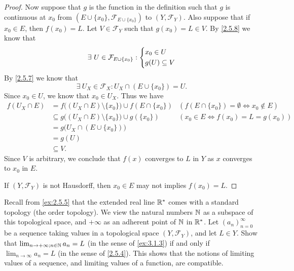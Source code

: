 \begin{proof}
  Now suppose that \(g\) is the function in the definition such that \(g\) is continuous at \(x_0\) from \((E \cup \{x_0\}, \mathcal{F}_{E \cup \{x_0\}})\) to \((Y, \mathcal{F}_Y)\).
  Also suppose that if \(x_0 \in E\), then \(f(x_0) = L\).
  Let \(V \in \mathcal{F}_Y\) such that \(g(x_0) = L \in V\).
  By \cref{2.5.8} we know that
  \[
    \exists\ U \in \mathcal{F}_{E \cup \{x_0\}} : \begin{dcases}
      x_0 \in U \\
      g(U) \subseteq V
    \end{dcases}
  \]
  By \cref{2.5.7} we know that
  \[
    \exists\ U_X \in \mathcal{F}_X : U_X \cap (E \cup \{x_0\}) = U.
  \]
  Since \(x_0 \in U\), we know that \(x_0 \in U_X\).
  Thus we have
  \begin{align*}
    f(U_X \cap E) & = f\big((U_X \cap E) \setminus \{x_0\}\big) \cup f(E \cap \{x_0\})  & (f(E \cap \{x_0\}) = \emptyset \iff x_0 \notin E) \\
                  & \subseteq g\big((U_X \cap E) \setminus \{x_0\}\big) \cup g(\{x_0\}) & (x_0 \in E \iff f(x_0) = L = g(x_0))              \\
                  & = g\big(U_X \cap (E \cup \{x_0\})\big)                                                                                  \\
                  & = g(U)                                                                                                                  \\
                  & \subseteq V.
  \end{align*}
  Since \(V\) is arbitrary, we conclude that \(f(x)\) converges to \(L\) in \(Y\) as \(x\) converges to \(x_0\) in \(E\).

  If \((Y, \mathcal{F}_Y)\) is not Hausdorff, then \(x_0 \in E\) may not implies \(f(x_0) = L\).
\end{proof}

\begin{ex}\label{ex:3.1.4}
  Recall from \cref{ex:2.5.5} that the extended real line \(\mathbb{R}^*\) comes with a standard topology (the order topology).
  We view the natural numbers \(\mathbb{N}\) as a subspace of this topological space, and \(+\infty\) as an adherent point of \(\mathbb{N}\) in \(\mathbb{R}^*\).
  Let \((a_n)_{n = 0}^\infty\) be a sequence taking values in a topological space \((Y, \mathcal{F}_Y)\), and let \(L \in Y\).
  Show that \(\lim_{n \to +\infty ; n \in \mathbb{N}} a_n = L\) (in the sense of \cref{ex:3.1.3}) if and only if \(\lim_{n \to \infty} a_n = L\) (in the sense of \cref{2.5.4}).
  This shows that the notions of limiting values of a sequence, and limiting values of a function, are compatible.
\end{ex}


